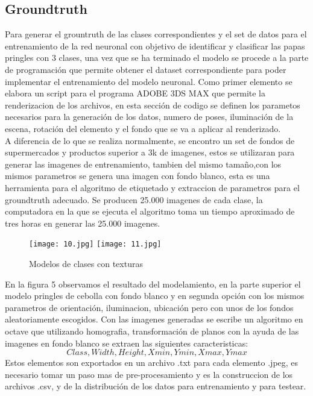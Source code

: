 \documentclass[conference]{IEEEtran}
\begin{document}
\subsection{Groundtruth}

Para generar el grountruth de las clases correspondientes y el set de datos para el entrenamiento de la red neuronal con objetivo de identificar y clasificar las papas pringles con 3 clases, una vez que se ha terminado el modelo se procede a la parte de programaci\'on que permite obtener el dataset correspondiente para poder implementar el entrenamiento del modelo neuronal.
Como primer elemento se elabora un script para el programa ADOBE 3DS MAX que permite la renderizacion de los archivos, en esta secci\'on de codigo se definen los parametos necesarios para la generaci\'on de los datos, numero de poses, iluminaci\'on de la escena, rotaci\'on del elemento y el fondo que se va a aplicar al renderizado.\\
A diferencia de lo que se realiza normalmente, se encontro un set de fondos de supermercados y productos superior a 3k de imagenes, estos se utilizaran para generar las imagenes de entrenamiento, tambien del mismo tamaño,con los mismos parametros se genera una imagen con fondo blanco, esta es una herramienta para el algoritmo de etiquetado y extraccion de parametros para el groundtruth adecuado.  Se producen 25.000 imagenes de cada clase, la computadora en la que se ejecuta el algoritmo toma un tiempo aproximado de tres horas en generar las 25.000 imagenes.\\
\begin{figure}[H]
	\centering
	\texttt{[image: 10.jpg]}
	\texttt{[image: 11.jpg]}
	\caption{Modelos de clases con texturas}
	\label{fig:Resultado Groundtruth}
\end{figure}
En la figura 5 observamos el resultado del modelamiento, en la parte superior el modelo pringles de cebolla con fondo blanco y en segunda opci\'on con los mismos parametros de orientaci\'on, iluminacion, ubicaci\'on pero con unos de los fondos aleatoriamente escogidos. Con las imagenes generadas se escribe un algoritmo en octave que utilizando homografia, transformaci\'on de planos con la ayuda de las imagenes en fondo blanco se extraen las siguientes caracteristicas:
\begin{equation}
Class, Width, Height, Xmin, Ymin, Xmax, Ymax
\end{equation}
Estos elementos son exportados en un archivo .txt para cada elemento .jpeg, es necesario tomar un paso mas de pre-procesamiento y es la construccion de los archivos .csv, y de la distribuci\'on de los datos para entrenamiento y para testear.
\end{document}
